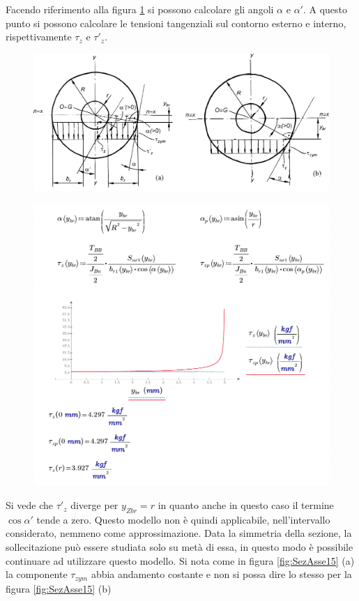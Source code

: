 Facendo riferimento alla figura \ref{fig:SezAsse14} si possono calcolare gli angoli $\alpha$ e $\alpha'$. A questo punto si possono calcolare le tensioni tangenziali sul contorno esterno e interno, rispettivamente $\tau_z$ e $\tau'_z$.
\begin{figure}[H]
\centering
  \includegraphics[width=.8\textwidth]{imgs/Cap7/SezAsse14}
\caption{}
\label{fig:SezAsse14}
\end{figure}
\begin{figure}[H]
\centering
  \includegraphics[width=.75\textwidth]{imgs/MathAsse7_1}
\caption{}
\label{fig:MathAsse7_1}
\end{figure}
Si vede che $\tau'_z$  diverge per $y_{Zbr}=r$ in quanto anche in questo caso il termine $\cos \alpha'$ tende a zero. Questo modello non è quindi applicabile, nell'intervallo considerato, nemmeno come approssimazione. 
Data la simmetria della sezione, la sollecitazione può essere studiata solo su metà di essa, in questo modo è possibile continuare ad utilizzare questo modello. 
Si nota come in figura \ref{fig:SezAsse15} (a) la componente $\tau_{zym}$ abbia andamento costante e non si possa dire lo stesso per la figura \ref{fig:SezAsse15} (b)
